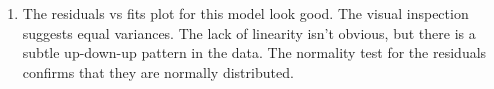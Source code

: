 \documentclass{article}
\providecommand{\tightlist}{%
      \setlength{\itemsep}{0pt}\setlength{\parskip}{0pt}}
\begin{document}
\newpage
\begin{enumerate}
\def\labelenumi{\alph{enumi})}
\setcounter{enumi}{1}
\tightlist
\item
  The residuals vs fits plot for this model look good. The visual
  inspection suggests equal variances. The lack of linearity isn't
  obvious, but there is a subtle up-down-up pattern in the data. The
  normality test for the residuals confirms that they are normally
  distributed.
  
  \begin{figure}[!h]
  \begin{floatrow}
  \end{floatrow}
\end{figure}
  
\end{enumerate}
\end{document}

